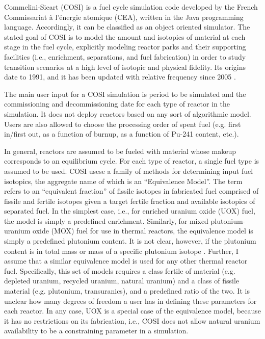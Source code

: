 Commelini-Sicart (COSI) is a fuel cycle simulation code developed by the French
Commissariat \`{a} l'\'{e}nergie atomique (CEA), written in the Java programming
language. Accordingly, it can be classified as an object oriented simulator. The
stated goal of COSI is to model the amount and isotopics of material at each
stage in the fuel cycle, explicitly modeling reactor parks and their supporting
facilities (i.e., enrichment, separations, and fuel fabrication) in order to
study transition scenarios at a high level of isotopic and physical
fidelity. Its origins date to 1991, and it has been updated with relative
frequency since 2005 \cite{boucher_cosi_2005,boucher_cosi:_2006,meyer_new_2009,
coquelet-pascal_validation_2011}.

The main user input for a COSI simulation is period to be simulated and the
commissioning and decommissioning date for each type of reactor in the
simulation. It does not deploy reactors based on any sort of algorithmic
model. Users are also allowed to choose the processing order of spent fuel
(e.g. first in/first out, as a function of burnup, as a function of Pu-241
content, etc.).

In general, reactors are assumed to be fueled with material whose makeup
corresponds to an equilibrium cycle. For each type of reactor, a single fuel
type is assumed to be used. COSI usese a family of methods for determining input
fuel isotopics, the aggregate name of which is an ``Equivalence Model''. The
term refers to an ``equivalent fraction'' of fissile isotopes in fabricated fuel
comprised of fissile and fertile isotopes given a target fertile fraction and
available isotopics of separated fuel. In the simplest case, i.e., for enriched
uranium oxide (UOX) fuel, the model is simply a predefined enrichment.
Similarly, for mixed plutonium-uranium oxide (MOX) fuel for use in thermal
reactors, the equivalence model is simply a predefined plutonium content. It is
not clear, however, if the plutonium content is in total mass or mass of a
specific plutonium isotope \cite{meyer_new_2009,
coquelet-pascal_validation_2011}. Further, I assume that a similar equivalence
model is used for any other thermal reactor fuel. Specifically, this set of
models requires a class fertile of material (e.g. depleted uranium, recycled
uranium, natural uranium) and a class of fissile material (e.g. plutonium,
transuranics), and a predefined ratio of the two. It is unclear how many degrees
of freedom a user has in defining these parameters for each reactor. In any
case, UOX is a special case of the equivalence model, because it has no
restrictions on its fabrication, i.e., COSI does not allow natural uranium
availability to be a constraining parameter in a simulation.

